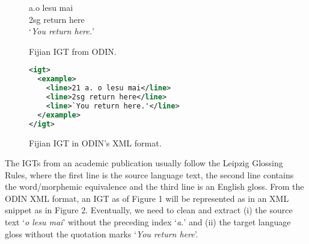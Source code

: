 \begin{figure}
 a.\quad o lesu mai \\
\indent \qquad\qquad 2sg return here \\
\indent \qquad\qquad `\emph{You return here.}' \\
\caption{Fijian IGT from ODIN.} \label{fig:odin_fijian}
\end{figure}





\begin{figure}
\begin{lstlisting}[language=XML]
<igt>
  <example>
    <line>21 a. o lesu mai</line>
    <line>2sg return here</line>
    <line>`You return here.'</line>
  </example>
</igt>
\end{lstlisting} 
\caption{Fijian IGT in ODIN's XML format.} \label{fig:odin_fijian_xml}
\end{figure}




\noindent The IGTs from an academic publication usually follow the Leipzig Glossing Rules, where the first line is the source language text, the second line contains the word/morphemic equivalence and the third line is an English gloss. From the ODIN XML format, an IGT as of Figure 1 will be represented as in an XML snippet as in Figure 2. Eventually, we need to clean and extract (i) the source text `\emph{o lesu mai}' without the preceding index `\emph{a.}' and (ii) the target language gloss without the quotation marks `\emph{You return here}'.


